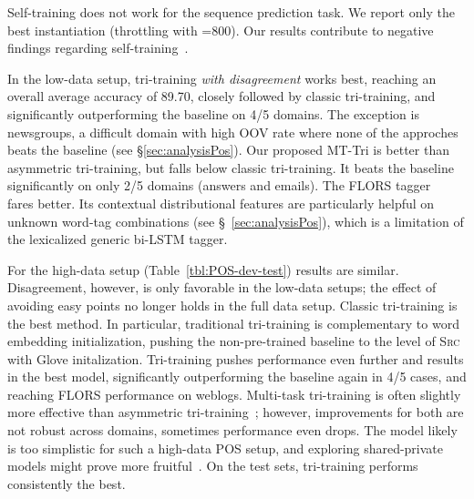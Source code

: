 \documentclass[11pt,a4paper]{article}
\begin{document}
Self-training does not work for the sequence prediction task. We report only the best instantiation (throttling with =800). Our results contribute to  negative findings regarding self-training~\cite{Plank2011,VanAsch2016}.

In the low-data setup, tri-training \textit{with disagreement} works best, reaching an overall average accuracy of 89.70, closely followed by classic tri-training, and significantly outperforming the baseline on 4/5 domains. The exception is newsgroups, a difficult domain with high OOV rate where none of the approches beats the baseline (see \S \ref{sec:analysisPos}). Our proposed MT-Tri is better than asymmetric tri-training, but falls below classic tri-training. It beats the baseline significantly on only 2/5 domains (answers and emails). The FLORS tagger~\cite{yin-schnabel-schutze:2015:EMNLP} fares better. Its contextual distributional features are particularly helpful on unknown word-tag combinations (see \S~\ref{sec:analysisPos}), which is a limitation of the lexicalized generic bi-LSTM tagger.

For the high-data setup (Table~\ref{tbl:POS-dev-test}) results are similar. Disagreement, however, is only favorable in the low-data setups; the effect of avoiding easy points no longer holds in the full data setup. Classic tri-training is the best method. In particular, traditional tri-training is complementary to word embedding initialization, pushing the non-pre-trained baseline to the level of \textsc{Src} with Glove initalization. Tri-training pushes performance even further and results in the best model, significantly outperforming the baseline again in 4/5 cases, and reaching FLORS performance on weblogs. Multi-task tri-training is often slightly more effective than asymmetric tri-training~\cite{Saito2017}; however, improvements for both are not robust across domains, sometimes performance even drops. The model likely is too simplistic for such a high-data POS setup, and exploring shared-private models might prove more fruitful~\cite{Liu:ea:2017:ACL}. On the test sets, tri-training performs consistently the best. 
\end{document}
